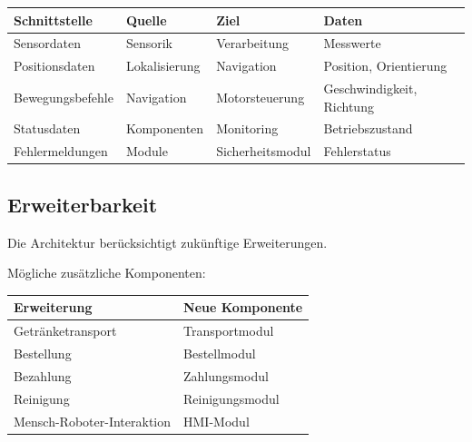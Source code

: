 \begin{longtable}[]{@{}
  >{\raggedright\arraybackslash}p{}
  >{\raggedright\arraybackslash}p{}
  >{\raggedright\arraybackslash}p{}
  >{\raggedright\arraybackslash}p{}@{}}
\toprule\noalign{}
\begin{minipage}[b]{\linewidth}\raggedright
Schnittstelle
\end{minipage} & \begin{minipage}[b]{\linewidth}\raggedright
Quelle
\end{minipage} & \begin{minipage}[b]{\linewidth}\raggedright
Ziel
\end{minipage} & \begin{minipage}[b]{\linewidth}\raggedright
Daten
\end{minipage} \\
\midrule\noalign{}
\endhead
\bottomrule\noalign{}
\endlastfoot
Sensordaten & Sensorik & Verarbeitung & Messwerte \\
Positionsdaten & Lokalisierung & Navigation & Position, Orientierung \\
Bewegungsbefehle & Navigation & Motorsteuerung & Geschwindigkeit,
Richtung \\
Statusdaten & Komponenten & Monitoring & Betriebszustand \\
Fehlermeldungen & Module & Sicherheitsmodul & Fehlerstatus \\
\end{longtable}

\subsection{Erweiterbarkeit}\label{erweiterbarkeit-1}

Die Architektur berücksichtigt zukünftige Erweiterungen.

Mögliche zusätzliche Komponenten:

\begin{longtable}[]{@{}ll@{}}
\toprule\noalign{}
Erweiterung & Neue Komponente \\
\midrule\noalign{}
\endhead
\bottomrule\noalign{}
\endlastfoot
Getränketransport & Transportmodul \\
Bestellung & Bestellmodul \\
Bezahlung & Zahlungsmodul \\
Reinigung & Reinigungsmodul \\
Mensch-Roboter-Interaktion & HMI-Modul \\
\end{longtable}

